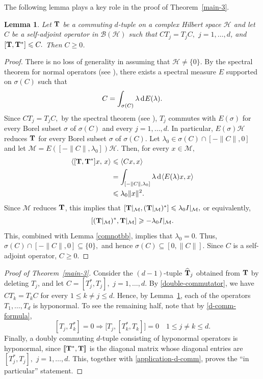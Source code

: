 \documentclass[10pt, a4paper, oneside, reqno]{amsproc}
\numberwithin{equation}{section}
\newtheorem{lemma}[theorem]{Lemma}
\theoremstyle{remark}
\theoremstyle{definition}
\newcommand*{\D}{\mathrm{d\hspace{.1ex}}}
\newcommand*{\Ge}{\geqslant}
\newcommand*{\Le}{\leqslant}
\begin{document}
The following lemma plays a key role in the proof of Theorem~\ref{main-3}.
\begin{lemma} \label{gen-fact}
Let ${\bf T}$ be a commuting $d$-tuple on a complex Hilbert space $\mathcal H$ and 
let $C$ be a self-adjoint operator in $\mathcal B(\mathcal H)$ such that $CT_j=T_jC,$ $j=1, \ldots, d$, and $[{\bf T}, {\bf T}^*] \Le C.$ Then $C \Ge 0$.  
\end{lemma}
\begin{proof} There is no loss of generality in assuming that $\mathcal H \neq \{0\}$.
By the spectral theorem for normal operators (see \cite[Theorem 1.12]{RR1973}), there exists a spectral measure $E$ supported on $\sigma(C)$ such that
	$$C=\int_{\sigma(C)} \lambda\, \D E(\lambda).$$ 
Since 
$CT_j=T_jC,$ by the spectral theorem (see \cite[Theorem 1.16]{RR1973}), $T_j$ commutes with $E(\sigma)$ for every Borel subset $\sigma$ of $\sigma(C)$ and every $j=1, \ldots, d$. In particular, $E(\sigma)\mathcal H$ reduces ${\bf T}$ for every Borel subset $\sigma$ of $\sigma(C)$. 
Let $\lambda_0 \in \sigma(C) \cap [-\|C\|, 0]$ and let $\mathcal M= E([-\|C\|, \lambda_0])\mathcal H$. Then, for every $x \in \mathcal M,$ 
\begin{align*}
\langle [{\bf T}, {\bf T}^*]x, \, x\rangle & \Le \langle Cx, x\rangle \\
&= \int_{[-\|C\|, \lambda_0]}
\lambda\, \D \langle E(\lambda)x,x\rangle \\
& \Le \lambda_0 \|x\|^{2}.
\end{align*}
Since $\mathcal M$ reduces ${\bf T}$, this implies that
$[{\bf T}|_{\mathcal M}, ({\bf T}|_{\mathcal M})^*]
\Le \lambda_0 I|_{\mathcal M},$ or equivalently, $$[({\bf T}|_{\mathcal M})^*, {\bf T}|_{\mathcal M}]
\Ge -\lambda_0 I|_{\mathcal M}.$$ This, combined with Lemma \ref{comnotbb}, implies that $\lambda_0 =0$. Thus, $\sigma(C) \cap [-\|C\|, 0] \subseteq \{0\},$ and hence $\sigma(C) \subseteq [0, \|C\|].$ Since $C$ is a self-adjoint operator, $C \Ge 0$. 
\end{proof}

\begin{proof}[Proof of Theorem~\ref{main-3}] 	 
Consider the $(d-1)$-tuple $\widehat{\bf T}_j$ obtained from ${\bf T}$ by deleting $T_j$, and let $C=[T^*_j, T_j],$ $j=1, \ldots, d.$ By \eqref{double-commutator}, we have $CT_k = T_k C$ for every $1 \Le k \neq j \Le d$. Hence, by Lemma~\ref{gen-fact}, each of the operators $T_1, \ldots, T_d$ is hyponormal. To see the remaining half, note that by \eqref{d-comm-formula},
\begin{equation} \label{application-d-comm}
 [T_j, T^*_k]=0 \Longrightarrow \big[T_j, [T^*_k, T_k]\big] = 0
\quad 1 \Le j \neq k \Le d. 
\end{equation}
Finally, a doubly commuting $d$-tuple consisting of hyponormal operators is hyponormal, since $[\![{\bf T}^*, {\bf T}]\!]$ is the diagonal matrix whose diagonal entries are $[T^*_j, T_j],$ $j=1, \ldots, d$. This, together with \eqref{application-d-comm}, 
proves the ``in particular” statement.
\end{proof}
\end{document}
